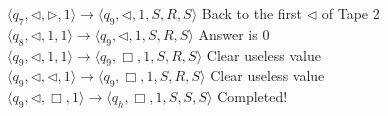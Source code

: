 \documentclass[12pt,a4paper]{article}
\theoremstyle{definition}
\numberwithin{equation}{section}
\numberwithin{figure}{section}
\begin{document}
\begin{enumerate}
$\langle q_7, \triangleleft, \triangleright, 1 \rangle  \rightarrow  \langle q_9, \triangleleft, 1, S, R, S \rangle$  Back to the first $\triangleleft$ of Tape 2 \\
$\langle q_8, \triangleleft, 1, 1 \rangle  \rightarrow  \langle q_9, \triangleleft, 1, S, R, S \rangle$  Answer is 0 \\
$\langle q_9, \triangleleft, 1, 1 \rangle  \rightarrow  \langle q_9, \Box, 1, S, R, S \rangle$  Clear useless value \\
$\langle q_9, \triangleleft, \triangleleft, 1 \rangle  \rightarrow  \langle q_9, \Box, 1, S, R, S \rangle$  Clear useless value \\
$\langle q_9, \triangleleft, \Box, 1 \rangle  \rightarrow  \langle q_h, \Box, 1, S, S, S \rangle$  Completed! \\


\end{enumerate}


\end{document}
